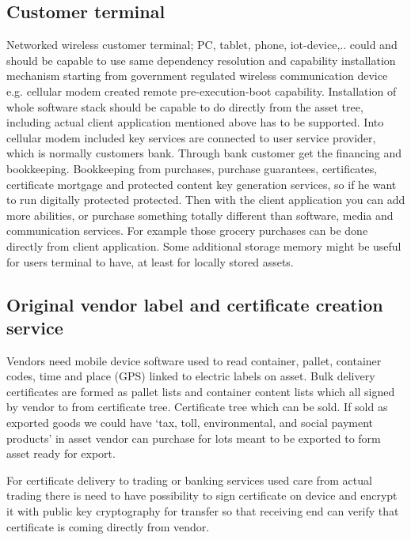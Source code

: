 \subsection{Customer terminal}
\label{customer_terminal}
Networked wireless customer terminal; PC, tablet, phone, iot-device,.. could
and should be capable to use same dependency resolution and capability
installation mechanism starting from government regulated wireless
communication device e.g. cellular modem created remote pre-execution-boot
capability. Installation of whole software stack should be capable to do
directly from the asset tree, including actual client application mentioned
above has to be supported. Into cellular modem included key services are
connected to user service provider, which is normally customers bank. Through
bank customer get the financing and bookkeeping. Bookkeeping from purchases,
purchase guarantees, certificates, certificate mortgage and protected content
key generation services, so if he want to run digitally protected protected.
Then with the client application you can add more abilities, or purchase
something totally different than software, media and communication services. 
For example those grocery purchases can be done directly from client
application. Some additional storage memory might be useful for users terminal
to have, at least for locally stored assets.

\subsection{Original vendor label and certificate creation service}
\label{label_and_certificate_service}
Vendors need mobile device software used to read container, pallet, container
codes, time and place (GPS) linked to electric labels on asset. Bulk delivery
certificates are formed as pallet lists and container content lists which all
signed by vendor to from certificate tree. Certificate tree which can be sold.
If sold as exported goods we could have `tax, toll, environmental, and social
payment products' in asset vendor can purchase for lots meant to be exported
to form asset ready for export.

For certificate delivery to trading or banking services used care from actual
trading there is need to have possibility to sign certificate on device and
encrypt it with public key cryptography for transfer so that receiving end can
verify that certificate is coming directly from vendor.

